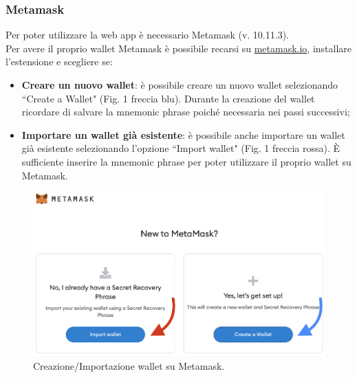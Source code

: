 \documentclass[a4paper, 12pt]{article}
\begin{document}
\subsubsection{Metamask}
Per poter utilizzare la web app è necessario Metamask (v. 10.11.3).\\
Per avere il proprio wallet Metamask è possibile recarsi su \href{https://www.metamask.io}{metamask.io}, installare l'estensione e scegliere se:
\begin{itemize}
  \item \textbf{Creare un nuovo wallet}: è possibile creare un nuovo wallet selezionando ``Create a Wallet" (Fig. 1 freccia blu). Durante la creazione del wallet ricordare di salvare la mnemonic phrase poiché necessaria nei passi successivi;
  \item \textbf{Importare un wallet già esistente}: è possibile anche importare un wallet già esistente selezionando l'opzione ``Import wallet" (Fig. 1 freccia rossa). È sufficiente inserire la mnemonic phrase per poter utilizzare il proprio wallet su Metamask.
\end{itemize}
\FloatBarrier
\begin{figure}[!h]
\centering
\includegraphics[width=0.8\linewidth]{img/metamask.png}
\caption{Creazione/Importazione wallet su Metamask.}
\end{figure}
\FloatBarrier
\end{document}
